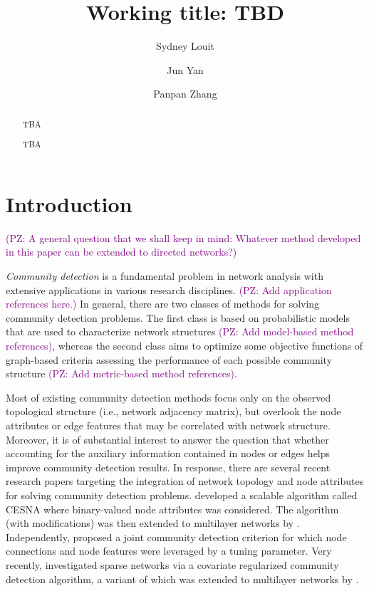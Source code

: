 \documentclass[12pt, titlepage, a4paper]{article}
\title{Working title: TBD}
\author[1]{Sydney Louit}
\author[1]{Jun Yan}
\affil[1]{Department of Statistics, University of Connecticut, 
Storrs, CT 06269, USA}
\author[2]{Panpan Zhang}
\affil[2]{Department of Biostatistics, Vanderbilt University Medical 
	Center, Nashville, TN 37203, USA}
\newcommand{\pz}[1]{\textcolor{purple}{(PZ: #1)}}
\begin{document}
	
\maketitle

\begin{abstract}
	TBA

\bigskip

 TBA

\end{abstract}

\doublespacing

\section{Introduction}
\label{sec:intro}
	
\pz{A general question that we shall keep in mind: Whatever method 
developed in this paper can be extended to directed networks?}

	
{\em Community detection} is a fundamental problem in network 
analysis with extensive applications in various research 
disciplines. \pz{Add application references here.} In general, there 
are two classes of methods for solving community detection	
problems. 
The first class is based on probabilistic models that are used to 
characterize network structures \pz{Add model-based method 
references}, whereas the second class aims to optimize some 
objective functions of graph-based criteria assessing the 
performance of each possible community structure \pz{Add 
metric-based method references}. 

	
Most of existing community detection methods focus only on the 
observed topological structure (i.e., network adjacency matrix), but 
overlook the node attributes or edge features that may be correlated 
with network structure. Moreover, it is of substantial interest to 
answer the question that whether accounting for the auxiliary 
information contained in nodes or edges helps improve community 
detection results. In response, there are several recent research 
papers targeting the integration of network topology and node 
attributes for solving community detection problems. 
\cite{yang2013community} developed a scalable algorithm called 
CESNA where binary-valued node attributes was considered. The 
algorithm (with modifications) was then extended to multilayer 
networks by \citet{contisciani2020community}. Independently, 
\citet{zhang2016community} proposed a joint community detection 
criterion for which node connections and node features were 
leveraged by a tuning parameter. Very recently, 
\citet{yan2021covariate} investigated sparse networks via a 
covariate regularized community detection algorithm, a variant 
of which was extended to multilayer networks by 
\citet{xu2022covariate}.
	
\end{document}
